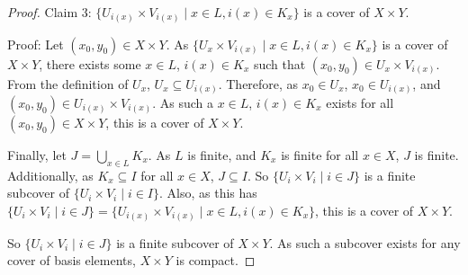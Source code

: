 \begin{proof}
	Claim 3: $\{U_{i(x)} \times V_{i(x)} \mid x \in L, i(x) \in K_x\}$ is a cover of $X \times Y$.
	
	Proof: Let $(x_0,y_0) \in X \times Y$. As $\{U_x \times V_{i(x)} \mid x \in L, i(x) \in K_x\}$ is a cover of $X \times Y$, there exists some $x \in L$, $i(x) \in K_x$ such that $(x_0,y_0) \in U_x \times V_{i(x)}$. From the definition of $U_x$, $U_x \subseteq U_{i(x)}$. Therefore, as $x_0 \in U_x$, $x_0 \in U_{i(x)}$, and $(x_0, y_0) \in U_{i(x)} \times V_{i(x)}$. As such a $x \in L$, $i(x) \in K_x$ exists for all $(x_0, y_0) \in X \times Y$, this is a cover of $X \times Y$. 
	
	Finally, let $J = \bigcup_{x \in L} K_x$. As $L$ is finite, and $K_x$ is finite for all $x \in X$, $J$ is finite. Additionally, as $K_x \subseteq I$ for all $x \in X$, $J \subseteq I$. So $\{U_i \times V_i \mid i \in J\}$ is a finite subcover of $\{U_i \times V_i \mid i \in I\}$. Also, as this has $\{U_i \times V_i \mid i \in J\} = \{U_{i(x)} \times V_{i(x)} \mid x \in L, i(x) \in K_x\}$, this is a cover of $X \times Y$.
	
	So $\{U_i \times V_i \mid i \in J\}$ is a finite subcover of $X \times Y$. As such a subcover exists for any cover of basis elements, $X \times Y$ is compact. 
\end{proof}

